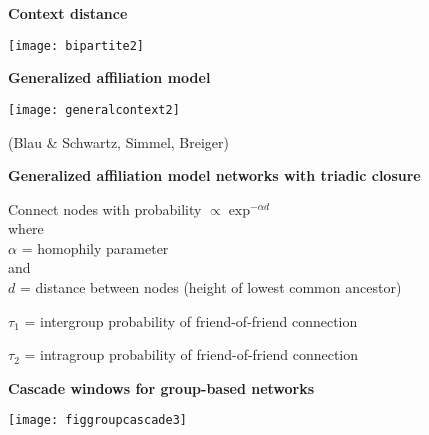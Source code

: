  
 
 
 

  \textbf{Context distance}
 
   \centering
   \texttt{[image: bipartite2]}
  

  \textbf{Generalized affiliation model}
 
   \centering
   \texttt{[image: generalcontext2]}
 
   (Blau \& Schwartz, Simmel, Breiger)
 
 
 


  \textbf{Generalized affiliation model networks with triadic closure}

  
   Connect nodes with probability $\propto \exp^{-\alpha d}$\\
  where\\
  $\alpha$ = homophily parameter\\
  and \\
  $d$ = distance between nodes (height of lowest common ancestor)
  
  $\tau_1$ = intergroup probability of friend-of-friend connection
  
  $\tau_2$ = intragroup probability of friend-of-friend connection
  
 

  \textbf{Cascade windows for group-based networks}

  \texttt{[image: figgroupcascade3]}\\



